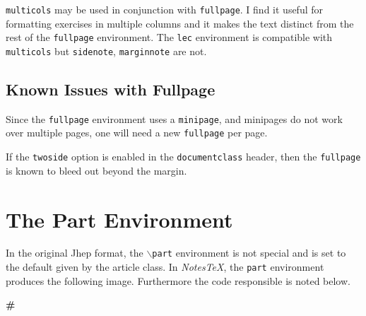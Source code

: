 \documentclass[10pt]{article}
\begin{document}
	\begin{fullpage}
		\begin{multicols}{2}
		\texttt{multicols}  may be used in conjunction with \texttt{fullpage}. I find it useful for formatting exercises in multiple columns and it makes the text distinct from the rest of the \texttt{fullpage} environment. The \texttt{lec} environment is compatible with \texttt{multicols} but \texttt{sidenote}, \texttt{marginnote} are not.\\

		\end{multicols}
	\end{fullpage}

	\subsection{Known Issues with Fullpage}\label{Sub: Fullpage_Issues}

	\begin{remark}
		Since the \texttt{fullpage} environment uses a \texttt{minipage}, and minipages do not work over multiple pages, one will need a new \texttt{fullpage} per page.
	\end{remark}
	\begin{remark}
		If the \texttt{twoside} option is enabled in the \texttt{documentclass} header, then the \texttt{fullpage} is known to bleed out beyond the margin.
	\end{remark}

		\section{The Part Environment}\label{sec:part}
	In the original Jhep format, the \texttt{$\backslash$part} environment is not special and is set to the default given by the article class. In \textit{NotesTeX}, the \texttt{part} environment produces the following image. Furthermore the code responsible is noted below.\\
	\begin{fullpage}
		{{\centering
		\begin{tcolorbox}[width=\marginparwidth,height=\marginparwidth/2,colback=black!50!white,colframe=black!50!white,center title,fonttitle=\bfseries\normalsize,title=PART,text fill]
		  \begin{center}
		  {\color{white}\Huge\bfseries\#}
		  \end{center}
		\end{tcolorbox}
	}}
	\end{fullpage}
\end{document}
